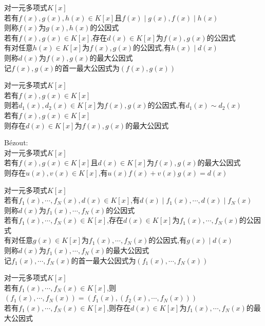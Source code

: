 \begin{dingyi}
对一元多项式$K[x]$\\
若有$f(x),g(x),h(x)\in K[x]$且$f(x)\mid g(x),f(x)\mid h(x)$\\
则称$f(x)$为$g(x),h(x)$的公因式\\
若有$f(x),g(x)\in K[x]$,存在$d(x)\in K[x]$为$f(x),g(x)$的公因式\\
有对任意$h(x)\in K[x]$为$f(x),g(x)$的公因式,有$h(x)\mid d(x)$\\
则称$d(x)$为$f(x),g(x)$的最大公因式\\
记$f(x),g(x)$的首一最大公因式为$(f(x),g(x))$
\end{dingyi}

\begin{dingli}
对一元多项式$K[x]$\\
若有$f(x),g(x)\in K[x]$\\
则若$d_1(x),d_2(x)\in K[x]$为$f(x),g(x)$的公因式,有$d_1(x)\sim d_2(x)$\\
若有$f(x),g(x)\in K[x]$\\
则存在$d(x)\in K[x]$为$f(x),g(x)$的最大公因式
\end{dingli}

\begin{dingli}
Bézout:\\
对一元多项式$K[x]$\\
若有$f(x),g(x)\in K[x]$且$d(x)\in K[x]$为$f(x),g(x)$的最大公因式\\
则存在$u(x),v(x)\in K[x]$,有$u(x)f(x)+v(x)g(x)=d(x)$
\end{dingli}

\begin{dingyi}
对一元多项式$K[x]$\\
若有$f_1(x),\cdots,f_N(x),d(x)\in K[x]$,有$d(x)\mid f_1(x),\cdots,d(x)\mid f_N(x)$\\
则称$d(x)$为$f_1(x),\cdots,f_N(x)$的公因式\\
若有$f_1(x),\cdots,f_N(x)\in K[x]$,存在$d(x)\in K[x]$为$f_1(x),\cdots,f_N(x)$的公因式\\
有对任意$g(x)\in K[x]$为$f_1(x),\cdots,f_N(x)$的公因式,有$g(x)\mid d(x)$\\
则称$d(x)$为$f_1(x),\cdots,f_N(x)$的最大公因式\\
记$f_1(x),\cdots,f_N(x)$的首一最大公因式为$(f_1(x),\cdots,f_N(x))$
\end{dingyi}

\begin{dingli}
对一元多项式$K[x]$\\
若有$f_1(x),\cdots,f_N(x)\in K[x]$,则$(f_1(x),\cdots,f_N(x))=(f_1(x),(f_2(x),\cdots,f_N(x)))$\\
若有$f_1(x),\cdots,f_N(x)\in K[x]$,则存在$d(x)\in K[x]$为$f_1(x),\cdots,f_N(x)$的最大公因式
\end{dingli}

